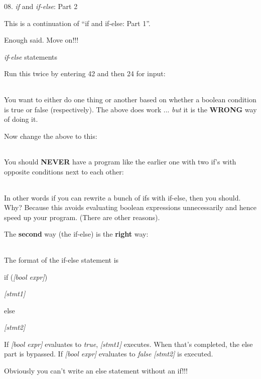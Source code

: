 \documentclass[
]{article}
\author{}
\date{}
\begin{document}
08. \emph{if} and \emph{if-else}: Part 2

This is a continuation of ``if and if-else: Part 1''.

Enough said. Move on!!!

\emph{if}-\emph{else} statements

Run this twice by entering 42 and then 24 for input:

\begin{longtable}[]{@{}@{}}
\toprule
\endhead
\bottomrule
\end{longtable}

You want to either do one thing or another based on whether a boolean
condition is true or false (respectively). The above does work ...
\emph{but} it is the \textbf{WRONG} way of doing it.

Now change the above to this:

\begin{longtable}[]{@{}@{}}
\toprule
\endhead
\bottomrule
\end{longtable}

You should \textbf{NEVER} have a program like the earlier one with two
if's with opposite conditions next to each other:

\begin{longtable}[]{@{}@{}}
\toprule
\endhead
\bottomrule
\end{longtable}

In other words if you can rewrite a bunch of ifs with if-else, then you
should. Why? Because this avoids evaluating boolean expressions
unnecessarily and hence speed up your program. (There are other
reasons).

The \textbf{second} way (the if-else) is the \textbf{right} way:

\begin{longtable}[]{@{}@{}}
\toprule
\endhead
\bottomrule
\end{longtable}

The format of the if-else statement is

if (\emph{{[}bool expr{]}})

\emph{{[}stmt1{]}}

else

\emph{{[}stmt2{]}}

If \emph{{[}bool expr{]}} evaluates to \emph{true}, \emph{{[}stmt1{]}}
executes. When that's completed, the else part is bypassed. If
\emph{{[}bool expr{]}} evaluates to \emph{false} \emph{{[}stmt2{]}} is
executed.

Obviously you can't write an else statement without an if!!!
\end{document}
